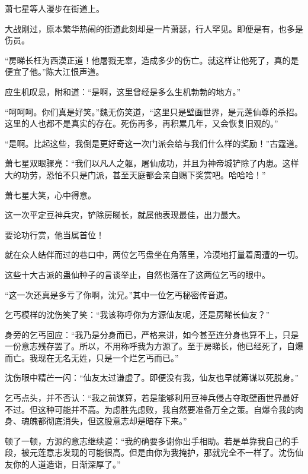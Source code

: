 
\begin{this_body}



萧七星等人漫步在街道上。

大战刚过，原本繁华热闹的街道此刻却是一片萧瑟，行人罕见。即便是有，也多是伤员。

“房睇长枉为西漠正道！他屠戮无辜，造成多少的伤亡。就这样让他死了，真的是便宜了他。”陈大江恨声道。

应生机叹息，附和道：“是啊，这里曾经是多么生机勃勃的地方。”

“呵呵呵。你们真是好笑。”魏无伤笑道，“这里只是壁画世界，是元莲仙尊的杀招。这里的人也都不是真实的存在。死伤再多，再积累几年，又会恢复旧观的。”

“是啊。比起这些，我倒是更好奇这一次门派会给与我们什么样的奖励！”古霆道。

萧七星双眼骤亮：“我们以凡人之躯，屠仙成功，并且为神帝城铲除了内患。这样大的功劳，恐怕不只是门派，甚至天庭都会亲自赐下奖赏吧。哈哈哈！”

萧七星大笑，心中得意。

这一次平定豆神兵灾，铲除房睇长，就属他表现最佳，出力最大。

要论功行赏，他当属首位！

就在众人结伴而过的巷口中，两位乞丐盘坐在角落里，冷漠地打量着周遭的一切。

这些十大古派的蛊仙种子的言谈举止，自然也落在了这两位乞丐的眼中。

“这一次还真是多亏了你啊，沈兄。”其中一位乞丐秘密传音道。

乞丐模样的沈伤笑了笑：“我该称呼你为方源仙友呢，还是房睇长仙友？”

身旁的乞丐回应：“我乃是分身而已，严格来讲，如今甚至连分身也算不上，只是一份意志残存罢了。所以，不用称呼我为方源了。至于房睇长，他已经死了，自爆而亡。我现在无名无姓，只是一个烂乞丐而已。”

沈伤眼中精芒一闪：“仙友太过谦虚了。即便没有我，仙友也早就筹谋以死脱身。”

乞丐点头，并不否认：“我之前谋算，若是能够利用豆神兵侵占夺取壁画世界最好不过。但这种可能并不高。为虑胜先虑败，我自然要准备万全之策。自爆令我的肉身、魂魄都彻底消失，但这股意志却是暗存下来。”

顿了一顿，方源的意志继续道：“我的确要多谢你出手相助。若是单靠我自己的手段，被元莲意志发现的可能很高。但是由你为我掩护，那就完全不一样了。沈伤仙友你的人道造诣，日渐深厚了。”


\end{this_body}
